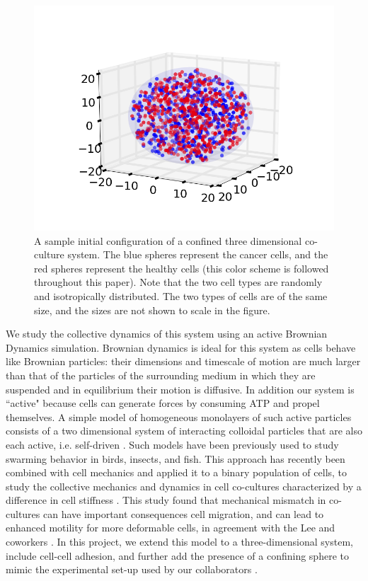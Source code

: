 \documentclass[aps,prb,twocolumn,groupedaddress,nofootinbib,floatfix]{revtex4}
\begin{document}
\begin{figure}
  \includegraphics[width=1.0\columnwidth]{images/3dconf.png}
  \caption[3dconf]
    {A sample initial configuration of a confined three dimensional co-culture system. The blue spheres represent the cancer cells, and the red spheres represent the healthy cells
    (this color scheme is followed throughout this paper). Note that the two cell types are randomly and isotropically distributed. The two types of cells are of the same size, and the sizes are not shown
    to scale in the figure.}
   \label{fig:3dconf}
\end{figure}

We study the collective dynamics of this system using an active Brownian Dynamics simulation. Brownian dynamics is ideal for this system as cells behave like Brownian particles: their dimensions and timescale of motion are much larger than that of the particles of the surrounding medium in which they are suspended and in equilibrium  their motion is diffusive. In addition
our system is ``active" because cells can generate forces by consuming ATP and propel themselves. A simple model of homogeneous monolayers of such active particles consists
of a two dimensional system of interacting colloidal particles that are also each active, i.e. self-driven \cite{FilyMarchetti,RednerBaskaran}. 
Such models have been previously used to study swarming  behavior \cite{Vicsek} in birds, insects, and fish.
This approach  has recently been combined with cell mechanics and applied it to a binary population of cells, to study the collective mechanics and dynamics in cell co-cultures characterized by a difference in cell stiffness \cite{Butcher}.
This study found that mechanical mismatch in co-cultures can have important consequences cell migration, and can lead to enhanced motility for more deformable cells\cite{Butcher}, 
in agreement with the Lee and coworkers \cite{Lee}. In this project, we extend this model to a three-dimensional system, include cell-cell adhesion, and further add the presence of a 
confining sphere to mimic the experimental set-up used by our collaborators \cite{Mingming}. 
\end{document}
